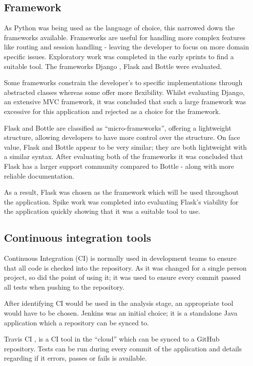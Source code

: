 \subsection{Framework} \label{language:framework}
As Python was being used as the language of choice, this narrowed down the frameworks available. Frameworks are useful for handling more complex features like routing and session handling - leaving the developer to focus on more domain specific issues.   Exploratory work was completed in the early sprints to find a suitable tool. The frameworks Django \cite{citeulike:14019784}, Flask \cite{citeulike:13160396} and Bottle \cite{citeulike:14019792} were evaluated.

Some frameworks constrain the developer's to specific implementations through abstracted classes whereas some offer more flexibility. Whilst evaluating Django, an extensive MVC framework, it was concluded that such a large framework was excessive for this application and rejected as a choice for the framework.

Flask and Bottle are classified as ``micro-frameworks'', offering a lightweight structure, allowing developers to have more control over the structure. On face value, Flask and Bottle appear to be very similar; they are both lightweight with a similar syntax. After evaluating both of the frameworks it was concluded that Flask has a larger support community compared to Bottle - along with more reliable documentation.

As a result, Flask was chosen as the framework which will be used throughout the application. Spike work was completed into evaluating Flask's viability for the application quickly showing that it was a suitable tool to use.

\subsection{Continuous integration tools}
Continuous Integration (CI) is normally used in development teams to ensure that all code is checked into the repository. As it was changed for a single person project, so did the point of using it; it was used to ensure every commit passed all tests when pushing to the repository.

After identifying CI would be used in the analysis stage, an appropriate tool would have to be chosen. Jenkins \cite{citeulike:14023837} was an initial choice; it is a standalone Java application which a repository can be synced to.

Travis CI \cite{citeulike:14023840}, is a CI tool in the ``cloud'' which can be synced to a GitHub repository. Tests can be run during every commit of the application and details regarding if it errors, passes or fails is available.

